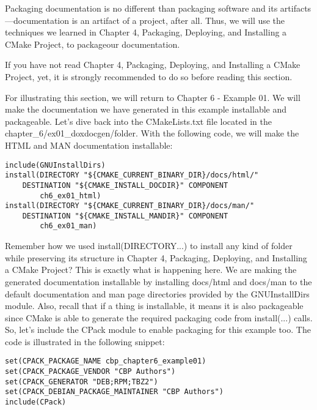 Packaging documentation is no different than packaging software and its artifacts—documentation is an artifact of a project, after all. Thus, we will use the techniques we learned in Chapter 4, Packaging, Deploying, and Installing a CMake Project, to packageour documentation.

\begin{tcolorbox}[colback=webgreen!5!white,colframe=webgreen!75!black,title=Note]
If you have not read Chapter 4, Packaging, Deploying, and Installing a CMake Project, yet, it is strongly recommended to do so before reading this section.
\end{tcolorbox}

For illustrating this section, we will return to Chapter 6 - Example 01. We will make the documentation we have generated in this example installable and packageable. Let's dive back into the CMakeLists.txt file located in the chapter\_6/ex01\_doxdocgen/folder. With the following code, we will make the HTML and MAN documentation installable:

\begin{lstlisting}[style=styleCMake]
include(GNUInstallDirs)
install(DIRECTORY "${CMAKE_CURRENT_BINARY_DIR}/docs/html/"
	DESTINATION "${CMAKE_INSTALL_DOCDIR}" COMPONENT
		ch6_ex01_html)
install(DIRECTORY "${CMAKE_CURRENT_BINARY_DIR}/docs/man/"
	DESTINATION "${CMAKE_INSTALL_MANDIR}" COMPONENT
		ch6_ex01_man)
\end{lstlisting}

Remember how we used install(DIRECTORY...) to install any kind of folder while preserving its structure in Chapter 4, Packaging, Deploying, and Installing a CMake Project? This is exactly what is happening here. We are making the generated documentation installable by installing docs/html and docs/man to the default documentation and man page directories provided by the GNUInstallDirs module. Also, recall that if a thing is installable, it means it is also packageable since CMake is able to generate the required packaging code from install(...) calls. So, let's include the CPack module to enable packaging for this example too. The code is illustrated in the following snippet:

\begin{lstlisting}[style=styleCMake]
set(CPACK_PACKAGE_NAME cbp_chapter6_example01)
set(CPACK_PACKAGE_VENDOR "CBP Authors")
set(CPACK_GENERATOR "DEB;RPM;TBZ2")
set(CPACK_DEBIAN_PACKAGE_MAINTAINER "CBP Authors")
include(CPack)
\end{lstlisting}

